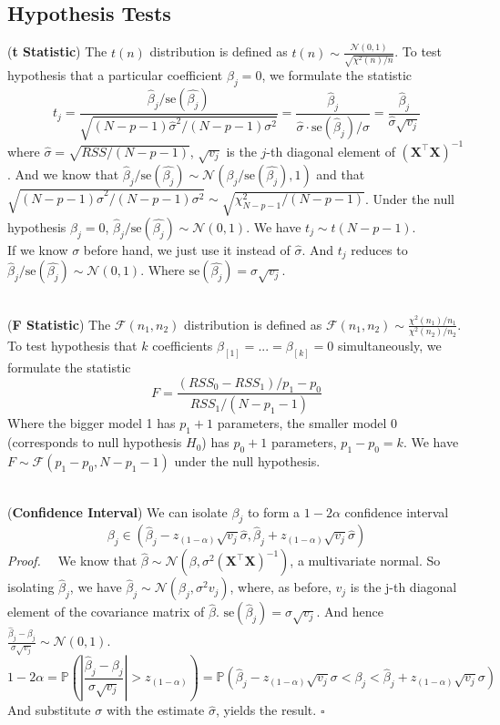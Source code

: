 \documentclass[a4paper, 11pt]{article}
\begin{document}
\subsection{Hypothesis Tests}
(\textbf{t Statistic}) The $t(n)$ distribution is defined as $t(n)\sim \frac{\mathcal{N}(0,1)}{\sqrt{\chi^2(n)/n}}$. To test hypothesis that a particular coefficient $\beta_j=0$, we formulate the statistic
$$
t_j = \frac{\hat{\beta}_j/\mathrm{se}(\hat{\beta_j})}{\sqrt{(N-p-1)\hat{\sigma}^2/(N-p-1)\sigma^2}} = \frac{\hat{\beta}_j}{\hat{\sigma} \cdot \mathrm{se}(\hat{\beta}_j)/\sigma} = \frac{\hat{\beta}_j}{\hat{\sigma} \sqrt{v_j}}
$$
where $\hat{\sigma}=\sqrt{RSS/(N-p-1)}$, $\sqrt{v_j}$ is the $j$-th diagonal element of $(\bm{X}^{\top} \bm{X})^{-1}$. And we know that $\hat{\beta}_j/\mathrm{se}(\hat{\beta_j})\sim \mathcal{N}(\beta_j/\mathrm{se}(\hat{\beta_j}),1)$ and that $\sqrt{(N-p-1)\hat{\sigma}^2/(N-p-1)\sigma^2}\sim \sqrt{\chi^2_{N-p-1}/(N-p-1)}$. Under the null hypothesis $\beta_j=0$, $\hat{\beta}_j/\mathrm{se}(\hat{\beta_j})\sim \mathcal{N}(0,1)$. We have $t_j \sim t(N-p-1)$. 
~\\ 
If we know $\sigma$ before hand, we just use it instead of $\hat{\sigma}$. And $t_j$ reduces to $\hat{\beta}_j/\mathrm{se}(\hat{\beta_j})\sim \mathcal{N}(0,1)$. Where $\mathrm{se}(\hat{\beta_j}) = \sigma \sqrt{v_j}$.

~\\
(\textbf{F Statistic}) The $\mathcal{F}(n_1, n_2)$ distribution is defined as $\mathcal{F}(n_1, n_2)\sim \frac{\chi^2(n_1)/n_1}{\chi^2(n_2)/n_2}$. To test hypothesis that $k$ coefficients $\beta_{[1]}=...=\beta_{[k]}=0$ simultaneously, we formulate the statistic
$$
F = \frac{(RSS_0 - RSS_1)/p_1-p_0}{RSS_1/(N-p_1-1)}
$$
Where the bigger model 1 has $p_1+1$ parameters, the smaller model 0 (corresponds to null hypothesis $H_0$) has $p_0+1$ parameters, $p_1-p_0=k$. We have $F\sim \mathcal{F}(p_1-p_0, N-p_1-1)$ under the null hypothesis.

~\\
(\textbf{Confidence Interval}) We can isolate $\beta_j$ to form a $1-2\alpha$ confidence interval
$$
\beta_j \in (\hat{\beta}_j-z_{(1-\alpha)} \sqrt{v_j}\hat{\sigma}, \hat{\beta}_j+z_{(1-\alpha)} \sqrt{v_j}\hat{\sigma})
$$
\textit{Proof.~~} We know that $\hat{\beta}\sim \mathcal{N}(\beta, \sigma^2 (\bm{X}^{\top} \bm{X})^{-1})$, a multivariate normal. So isolating $\hat{\beta}_j$, we have $\hat{\beta}_j\sim \mathcal{N}(\beta_j, \sigma^2 v_j)$, where, as before, $v_j$ is the j-th diagonal element of the covariance matrix of $\hat{\beta}$. $\text{se}(\hat{\beta}_j)=\sigma \sqrt{v_j}$. And hence $\frac{\hat{\beta}_j-\beta_j}{\sigma \sqrt{v_j}}\sim \mathcal{N}(0,1)$.
$$
1- 2 \alpha = \mathbb{P}\left(\left|\frac{\hat{\beta}_j-\beta_j}{\sigma \sqrt{v_j}}\right|> z_{(1-\alpha)}\right) = \mathbb{P}\left(\hat{\beta}_j-z_{(1-\alpha)} \sqrt{v_j}\sigma<\beta_j<\hat{\beta}_j+z_{(1-\alpha)} \sqrt{v_j}\sigma\right)
$$
And substitute $\sigma$ with the estimate $\hat{\sigma}$, yields the result. $\square$
\end{document}
